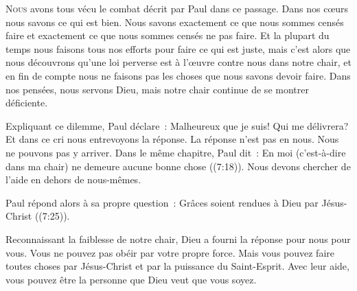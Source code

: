 


\lettrine{N}{ous} avons tous vécu le combat décrit par Paul dans ce passage.
 Dans nos c\oe{}urs nous savons ce qui est bien.
 Nous savons exactement ce que nous sommes censés faire
 et exactement ce que nous sommes censés ne pas faire.
 Et la plupart du temps nous faisons tous nos efforts pour faire
 ce qui est juste, mais c'est alors que nous découvrons qu'une loi perverse
 est à l'\oe{}uvre contre nous dans notre chair,
 et en fin de compte nous ne faisons pas les choses
 que nous savons devoir faire.
 Dans nos pensées, nous servons Dieu,
 mais notre chair continue de se montrer déficiente.

Expliquant ce dilemme, Paul déclare~: 
 \og Malheureux que je suis! Qui me délivrera? \fg{}
 Et dans ce cri nous entrevoyons la réponse. La réponse n'est pas en nous.
 Nous ne pouvons pas y arriver. Dans le même chapitre, 
 Paul dit~: 
 \og En moi (c'est-à-dire dans ma chair) ne demeure aucune bonne chose \fg{}
 ((7:18)).
 Nous devons chercher de l'aide en dehors de nous-mêmes.

Paul répond alors à sa propre question~: 
 \og Grâces soient rendues à Dieu par Jésus-Christ \fg{}
 ((7:25)).

Reconnaissant la faiblesse de notre chair, Dieu a fourni la réponse
 pour nous \ocadr pour vous. Vous ne pouvez pas obéir par votre propre force.
 Mais vous pouvez faire toutes choses par Jésus-Christ et par la puissance
 du Saint-Esprit. Avec leur aide, vous pouvez être la personne que Dieu
 veut que vous soyez.

\dvrule







